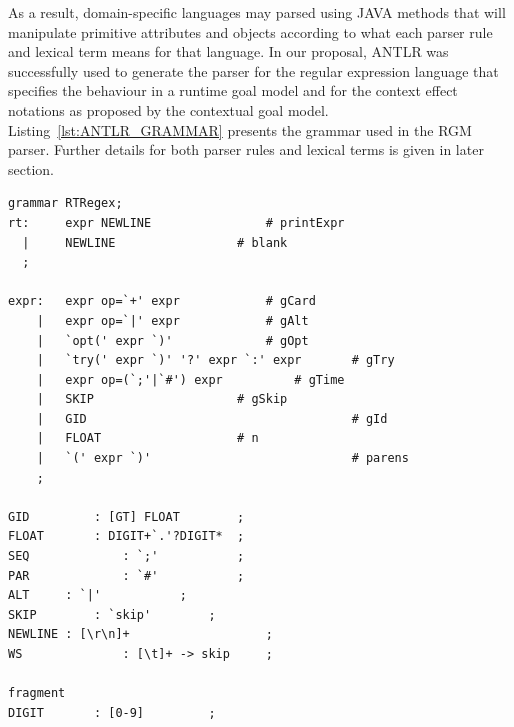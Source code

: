 As a result, domain-specific languages may parsed using JAVA methods that will manipulate primitive attributes and objects according to what each parser rule and lexical term means for that language. In our proposal, ANTLR was successfully used to generate the parser for the regular expression language that specifies the behaviour in a runtime goal model and for the context effect notations as proposed by the contextual goal model. Listing~\ref{lst:ANTLR_GRAMMAR} presents the grammar used in the RGM parser. Further details for both parser rules and lexical terms is given in later section.

\begin{lstlisting}[style=ANTLR, caption={ANTLR grammar for the RGM behaviour regex},label={lst:ANTLR_GRAMMAR}] 
grammar RTRegex;
rt:     expr NEWLINE				# printExpr
  |     NEWLINE					# blank
  ;

expr:   expr op=`+' expr			# gCard
    |	expr op=`|' expr			# gAlt
    |	`opt(' expr `)'				# gOpt
    |   `try(' expr `)' '?' expr `:' expr       # gTry
    |	expr op=(`;'|`#') expr			# gTime
    |   SKIP					# gSkip
    |   GID                                     # gId
    |   FLOAT					# n
    |   `(' expr `)'                            # parens
    ;

GID     	: [GT] FLOAT		;
FLOAT		: DIGIT+`.'?DIGIT* 	;
SEQ             : `;'			;
PAR             : `#'			;
ALT		: `|'			;
SKIP		: `skip'		;
NEWLINE : [\r\n]+               	;
WS              : [\t]+ -> skip 	;

fragment
DIGIT		: [0-9]			;

\end{lstlisting}